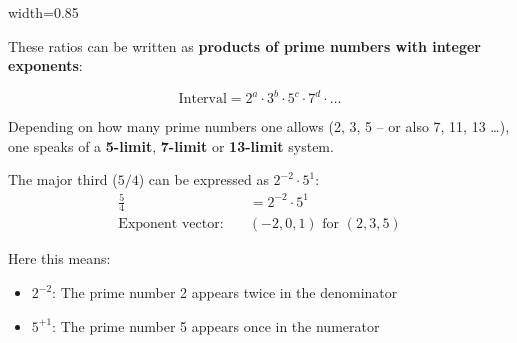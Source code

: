 	\begin{table}[htbp]
		\centering
		\begin{adjustbox}{width=0.85\textwidth}
		\end{adjustbox}
		\caption{Musical intervals in relational representation}
		\label{tab:intervalle}
	\end{table}
	
	These ratios can be written as \textbf{products of prime numbers with integer exponents}:
	
	\begin{equation}
		\text{Interval} = 2^a \cdot 3^b \cdot 5^c \cdot 7^d \cdot \ldots
	\end{equation}
	
	Depending on how many prime numbers one allows (2, 3, 5 – or also 7, 11, 13 \ldots), one speaks of a \textbf{5-limit}, \textbf{7-limit} or \textbf{13-limit} system.
	
	\begin{example}
		The major third ($5/4$) can be expressed as $2^{-2} \cdot 5^1$:
		\begin{align}
			\frac{5}{4} &= 2^{-2} \cdot 5^1 \\
			\text{Exponent vector:} \quad &(-2, 0, 1) \text{ for } (2, 3, 5)
		\end{align}
		
		Here this means:
		\begin{itemize}
			\item $2^{-2}$: The prime number 2 appears twice in the denominator
			\item $5^{+1}$: The prime number 5 appears once in the numerator
		\end{itemize}
	\end{example}
	
